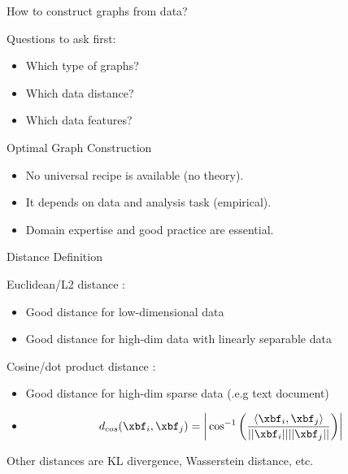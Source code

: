 \documentclass[aspectratio=169,xcolor=dvipsnames,svgnames,x11names,fleqn]{beamer}
\begin{document}
\begin{frame}{How to construct graphs from data?}

Questions to ask first:

\begin{itemize}
\item Which type of graphs?
\item Which data distance?
\item Which data features?
\end{itemize}

\vspace{5pt}

Optimal Graph Construction

\begin{itemize}
\item No universal recipe is available (no theory).
\item It depends on data and analysis task (empirical).
\item Domain expertise and good practice are essential.
\end{itemize}

\end{frame}

\begin{frame}{Distance Definition}

Euclidean/L2 distance :

\begin{itemize}
\item Good distance for low-dimensional data
\item Good distance for high-dim data with linearly separable data
\end{itemize}

Cosine/dot product distance :

\begin{itemize}
\item Good distance for high-dim sparse data (.e.g text document)
\item \begin{align*}
d_{cos}(\xbf_i, \xbf_j) = \bigg|  \cos^{-1}\bigg( \frac{\langle \xbf_i, \xbf_j \rangle}{|| \xbf_i|| || \xbf_j|| }  \bigg)  \bigg|
\end{align*}
\end{itemize}

Other distances are KL divergence, Wasserstein distance, etc.


\end{frame}
\end{document}
